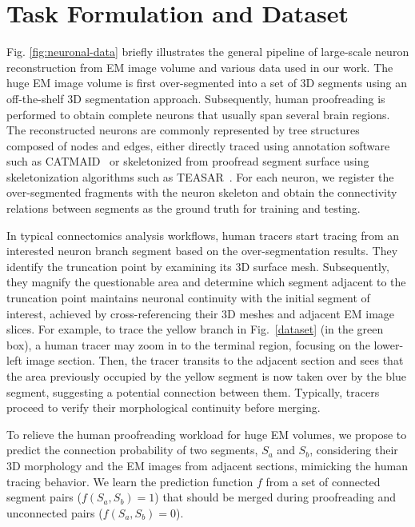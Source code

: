 \section{Task Formulation and Dataset}
\label{sec:datasets}
 
Fig. \ref{fig:neuronal-data} briefly illustrates the general pipeline of large-scale neuron reconstruction from EM image volume and various data used in our work.
The huge EM image volume is first over-segmented into a set of 3D segments using an off-the-shelf 3D segmentation approach. Subsequently, human proofreading is performed to obtain complete neurons that usually span several brain regions. The reconstructed neurons are commonly represented by tree structures composed of nodes and edges, either directly traced using annotation software such as CATMAID~\cite{saalfeld2009catmaid} or skeletonized from proofread segment surface using skeletonization algorithms such as TEASAR~\cite{sato2000teasar}. 
For each neuron, we register the over-segmented fragments with the neuron skeleton and obtain the connectivity relations between segments as the ground truth for training and testing.
 
In typical connectomics analysis workflows, human tracers start tracing from an interested neuron branch segment based on the over-segmentation results.
They identify the truncation point by examining its 3D surface mesh. Subsequently, they magnify the questionable area and determine which segment adjacent to the truncation point maintains neuronal continuity with the initial segment of interest, achieved by cross-referencing their 3D meshes and adjacent EM image slices.
For example, to trace the yellow branch in Fig.~\ref{dataset} (in the green box), a human tracer may zoom in to the terminal region, focusing on the lower-left image section. Then, the tracer transits to the adjacent section and sees that the area previously occupied by the yellow segment is now taken over by the blue segment, suggesting a potential connection between them. Typically, tracers proceed to verify their morphological continuity before merging.
   

To relieve the human proofreading workload for huge EM volumes, we propose to predict the connection probability of two segments, $S_a$ and $S_b$, considering their 3D morphology and the EM images from adjacent sections, mimicking the human tracing behavior. We learn the prediction function $f$ from a set of connected segment pairs ($f(S_a, S_b)=1$) that should be merged during proofreading and unconnected pairs ($f(S_a, S_b)=0$). 
 
